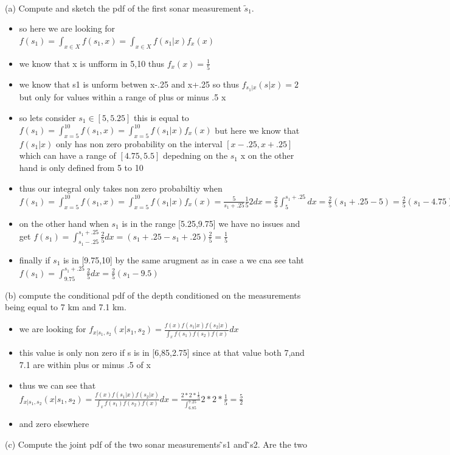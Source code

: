 \documentclass[10pt]{article}
\begin{document}
\\(a) Compute and sketch the pdf of the first sonar measurement $\tilde{s}_1$.
\begin{itemize}
    \item so here we are looking for $f(s_1)=\int_{x\in X}f(s_1,x)=\int_{x\in X}f(s_1|x)f_x(x)$
    \item we know that x is unfform in 5,10 thus $f_x(x)=\frac{1}{5}$
    \item we know that s1 is unform betwen x-.25 and x+.25  so thus $f_{s_1|x}(s|x)=2$ but only for values within a range of plus or minus .5 x
    \item so lets consider $s_1\in[5,5.25]$ this is equal to $f(s_1)=\int_{x=5}^{10}f(s_1,x)=\int_{x=5}^{10}f(s_1|x)f_x(x)$ but here we know that $f(s_1|x)$ only has non zero probability on the interval $[x-.25,x+.25]$ which can have a range of $[4.75,5.5]$ depedning on the $s_1$ x on the other hand is only defined from 5 to 10
    \item thus our integral only takes non zero probabiltiy when $f(s_1)=\int_{x=5}^{10}f(s_1,x)=\int_{x=5}^{10}f(s_1|x)f_x(x)=\frac{5}{s_1+.25}\frac{1}{5}2dx=\frac{2}{5}\int_{5}^{s_1+.25}dx=\frac{2}{5}(s_1+.25-5)=\frac{2}{5}(s_1-4.75)$
    \item on the other hand when $s_1$ is in the range [5.25,9.75] we have no issues and get  $f(s_1)=\int_{s_1-.25}^{s_1+.25}\frac{2}{5}dx=(s_1+.25-s_1+.25)\frac{2}{5}=\frac{1}{5}$
    \item finally if $s_1$ is in [9.75,10] by the same arugment as in case a we cna see taht  $f(s_1)=\int_{9.75}^{s_1+.25}\frac{2}{5}dx=\frac{2}{5}(s_1-9.5)$
\end{itemize}
(b) compute the conditional pdf of the depth conditioned on the measurements being
equal to 7 km and 7.1 km.
\begin{itemize}
    \item we are looking for $f_{x|s_1,s_2}(x|s_1,s_2)=\frac{f(x)f(s_1|x)f(s_2|x)}{\int_{x}f(s_1)f(s_2)f(x)}dx$
    \item this value is only non zero if s is in [6,85,2.75] since at that value both 7,and 7.1 are within plus or minus .5 of x
    \item thus we can see that $f_{x|s_1,s_2}(x|s_1,s_2)=\frac{f(x)f(s_1|x)f(s_2|x)}{\int_{x}f(s_1)f(s_2)f(x)}dx=\frac{2*2*\frac{1}{5}}{\int_{6.85}^{7.25}}2*2*\frac{1}{5}=\frac{5}{2}$
    \item and zero elsewhere 
\end{itemize}
(c) Compute the joint pdf of the two sonar measurements  ̃s1 and  ̃s2. Are the two
\end{document}

